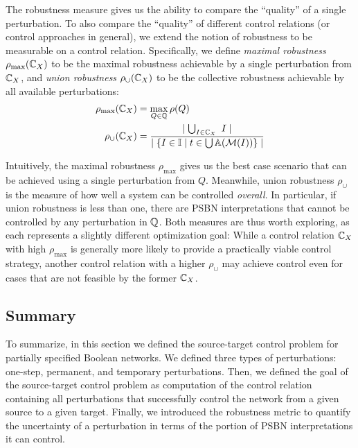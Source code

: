 The robustness measure gives us the ability to compare the ``quality'' of a single perturbation. To also compare the ``quality'' of different control relations (or control approaches in general), we extend the notion of robustness to be measurable on a control relation. Specifically, we define \emph{maximal robustness} $\rho_{\max}(\mathbb{C}_{X})$ to be the maximal robustness achievable by a single perturbation from $\mathbb{C}_{X}$, and \emph{union robustness} $\rho_{\cup}(\mathbb{C}_{X})$ to be the collective robustness achievable by all available perturbations: 
\begin{align*}
	\rho_{\max}(\mathbb{C}_{X}) &= \max_{Q \in \mathbb{Q}} \rho(Q) \\
	\rho_{\cup}(\mathbb{C}_{X}) &= \frac{ \mid \bigcup_{I \in \mathbb{C}_{X}}\ I \mid }{\mid \{ I \in \mathbb{I} \mid t \in \bigcup \mathbb{A}(\mathcal{M}(I)) \} \mid}
\end{align*}

Intuitively, the maximal robustness $\rho_{\max}$ gives us the best case scenario that can be achieved using a single perturbation from $Q$. Meanwhile, union robustness $\rho_{\cup}$ is the measure of how well a system can be controlled \emph{overall}. In particular, if union robustness is less than one, there are PSBN interpretations that cannot be controlled by any perturbation in $\mathbb{Q}$. Both measures are thus worth exploring, as each represents a slightly different optimization goal: While a control relation $\mathbb{C}_{X}$ with high $\rho_{\max}$ is generally more likely to provide a practically viable control strategy, another control relation with a higher $\rho_{\cup}$ may achieve control even for cases that are not feasible by the former $\mathbb{C}_{X}$.

\subsection{Summary}

To summarize, in this section we defined the source-target control problem for partially specified Boolean networks. We defined three types of perturbations: one-step, permanent, and temporary perturbations. Then, we defined the goal of the source-target control problem as computation of the control relation containing all perturbations that successfully control the network from a given source to a given target. Finally, we introduced the robustness metric to quantify the uncertainty of a perturbation in terms of the portion of PSBN interpretations it can control.

